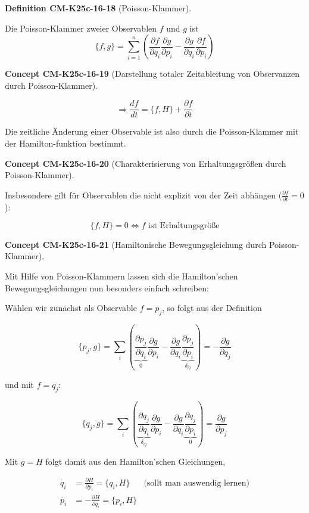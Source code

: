 \documentclass[10pt, letterpaper]{article}
\newcommand{\CustomHeading}[3]{%
  \par\medskip\noindent%
  \textbf{#1 #2} \textnormal{(#3)}.\enskip%
}
\newenvironment{DEF}[2]{\CustomHeading{Definition}{#1}{#2}}{}
\newenvironment{CONC}[2]{\CustomHeading{Concept}{#1}{#2}}{}
\begin{document}
\begin{DEF}{CM-K25c-16-18}{Poisson-Klammer}
Die Poisson-Klammer zweier Observablen $f$ und $g$ ist
\[\{f,g\} = \sum_{i=1}^n \left(\frac{\partial f}{\partial q_i}\frac{\partial g}{\partial p_i} - \frac{\partial g}{\partial q_i}\frac{\partial f}{\partial p_i}\right)\]
\end{DEF}

\begin{CONC}{CM-K25c-16-19}{Darstellung totaler Zeitableitung von Observanzen durch Poisson-Klammer}
\[\Rightarrow \frac{df}{dt} = \{f,H\} + \frac{\partial f}{\partial t}\]

Die zeitliche Änderung einer Observable ist also durch die Poisson-Klammer mit der Hamilton-funktion bestimmt.
\end{CONC}

\begin{CONC}{CM-K25c-16-20}{Charakterisierung von Erhaltungsgrößen durch Poisson-Klammer}
Insbesondere gilt für Observablen die nicht explizit von der Zeit abhängen ($\frac{\partial f}{\partial t} = 0$):

\[\{f,H\} = 0 \Leftrightarrow f \text{ ist Erhaltungsgröße}\]
\end{CONC}

\begin{CONC}{CM-K25c-16-21}{Hamiltonische Bewegungsgleichung durch Poisson-Klammer}
Mit Hilfe von Poisson-Klammern lassen sich die Hamilton'schen Bewegungsgleichungen nun besonders einfach schreiben:

Wählen wir zunächst als Observable $f = p_j$, so folgt aus der Definition

\[\{p_j,g\} = \sum_i \left(\underbrace{\frac{\partial p_j}{\partial q_i}}_{0}\frac{\partial g}{\partial p_i} - \frac{\partial g}{\partial q_i}\underbrace{\frac{\partial p_j}{\partial p_i}}_{\delta_{ij}}\right) = -\frac{\partial g}{\partial q_j}\]

und mit $f = q_j$:

\[\{q_j,g\} = \sum_i \left(\underbrace{\frac{\partial q_j}{\partial q_i}}_{\delta_{ij}}\frac{\partial g}{\partial p_i} - \frac{\partial g}{\partial q_i}\underbrace{\frac{\partial q_j}{\partial p_i}}_{0}\right) = \frac{\partial g}{\partial p_j}\]

Mit $g = H$ folgt damit aus den Hamilton'schen Gleichungen,

\[\boxed{\begin{aligned}
\dot{q_i} &= \frac{\partial H}{\partial p_i} = \{q_i,H\} & \text{(sollt man auswendig lernen)} \\
\dot{p_i} &= -\frac{\partial H}{\partial q_i} = \{p_i,H\}
\end{aligned}}\]
\end{CONC}
\end{document}
